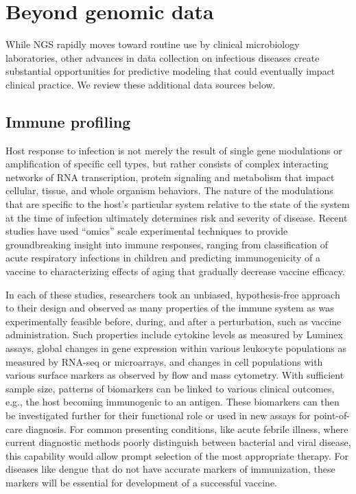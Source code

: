 \section{Beyond genomic data}

While NGS rapidly moves toward routine use by clinical microbiology laboratories, other advances in data collection on infectious diseases create substantial opportunities for predictive modeling that could eventually impact clinical practice. We review these additional data sources below.

\subsection{Immune profiling}

Host response to infection is not merely the result of single gene modulations or amplification of specific cell types, but rather consists of complex interacting networks of RNA transcription, protein signaling and metabolism that impact cellular, tissue, and whole organism behaviors. The nature of the modulations that are specific to the host’s particular system relative to the state of the system at the time of infection ultimately determines risk and severity of disease. Recent studies have used “omics” scale experimental techniques to provide groundbreaking insight into immune responses, ranging from classification of acute respiratory infections in children\autocite{Mejias2014} and predicting immunogenicity of a vaccine\autocite{Querec2009} to characterizing effects of aging that gradually decrease vaccine efficacy.\autocite{Poland2014}

In each of these studies, researchers took an unbiased, hypothesis-free approach to their design and observed as many properties of the immune system as was experimentally feasible before, during, and after a perturbation, such as vaccine administration. Such properties include cytokine levels as measured by Luminex assays, global changes in gene expression within various leukocyte populations as measured by RNA-seq or microarrays, and changes in cell populations with various surface markers as observed by flow and mass cytometry. With sufficient sample size, patterns of biomarkers can be linked to various clinical outcomes, e.g., the host becoming immunogenic to an antigen. These biomarkers can then be investigated further for their functional role or used in new assays for point-of-care diagnosis. For common presenting conditions, like acute febrile illness, where current diagnostic methods poorly distinguish between bacterial and viral disease, this capability would allow prompt selection of the most appropriate therapy.\autocite{Mejias2014} For diseases like dengue that do not have accurate markers of immunization, these markers will be essential for development of a successful vaccine.\autocite{Mahalingam2013}

